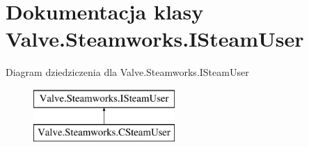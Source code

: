 \hypertarget{class_valve_1_1_steamworks_1_1_i_steam_user}{}\section{Dokumentacja klasy Valve.\+Steamworks.\+I\+Steam\+User}
\label{class_valve_1_1_steamworks_1_1_i_steam_user}
Diagram dziedziczenia dla Valve.\+Steamworks.\+I\+Steam\+User\begin{figure}[H]
\begin{center}
\leavevmode
\includegraphics[height=2.000000cm]{class_valve_1_1_steamworks_1_1_i_steam_user}
\end{center}
\end{figure}
